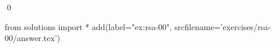 
\begin{ex} 
  \label{ex:rsa-00}
  
  \qed
\end{ex} 
\begin{python0}
from solutions import *
add(label="ex:rsa-00",
    srcfilename='exercises/rsa-00/answer.tex') 
\end{python0}
